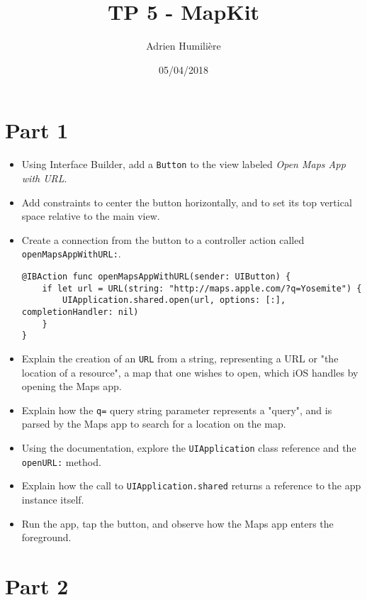 \documentclass[a4paper,11pt]{scrartcl}
\begin{document}
\newcommand{\mytitle}{TP 5 - MapKit}
\title{\mytitle}
\author{Adrien Humilière}
\date{05/04/2018}

\maketitle

\section*{Part 1}

\begin{itemize}
\item Using Interface Builder, add a \texttt{Button} to the view labeled \textit{Open Maps App with URL}.
\item Add constraints to center the button horizontally, and to set its top vertical space relative to the main view.
\item Create a connection from the button to a controller action called \texttt{openMapsAppWithURL:}.
\begin{lstlisting}
@IBAction func openMapsAppWithURL(sender: UIButton) {
	if let url = URL(string: "http://maps.apple.com/?q=Yosemite") {
		UIApplication.shared.open(url, options: [:], completionHandler: nil)
	}
}
\end{lstlisting}
\item Explain the creation of an \texttt{URL} from a string, representing a URL or "the location of a resource", a map that one wishes to open, which iOS handles by opening the Maps app.
\item Explain how the \texttt{q=} query string parameter represents a "query", and is parsed by the Maps app to search for a location on the map.
\item Using the documentation, explore the \texttt{UIApplication} class reference and the \texttt{openURL:} method.
\item Explain how the call to \texttt{UIApplication.shared} returns a reference to the app instance itself.
\item Run the app, tap the button, and observe how the Maps app enters the foreground.
\end{itemize}

\section*{Part 2}
\end{document}

